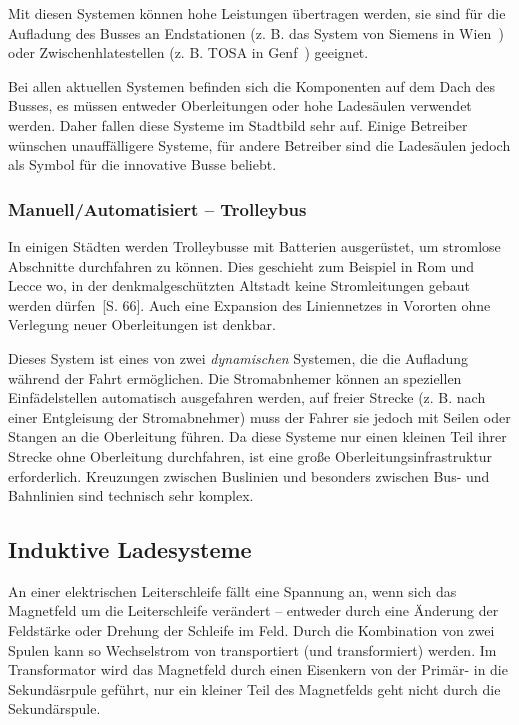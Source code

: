 Mit diesen Systemen können hohe Leistungen übertragen werden, sie sind für die Aufladung des Busses an Endstationen (z. B. das System von Siemens in Wien~\cite{SiemensWien}) oder Zwischenhlatestellen (z. B. TOSA in Genf~\cite{tosa}) geeignet. 

Bei allen aktuellen Systemen befinden sich die Komponenten auf dem Dach des Busses, es müssen entweder Oberleitungen oder hohe Ladesäulen verwendet werden. Daher fallen diese Systeme im Stadtbild sehr auf. Einige Betreiber wünschen unauffälligere Systeme, für andere Betreiber sind die Ladesäulen jedoch als Symbol für die innovative Busse beliebt.

\subsubsection{Manuell/Automatisiert – Trolleybus}
In einigen Städten werden Trolleybusse mit Batterien ausgerüstet, um stromlose Abschnitte durchfahren zu können. Dies geschieht zum Beispiel in Rom und Lecce wo, in der denkmalgeschützten Altstadt keine Stromleitungen gebaut werden dürfen~\cite{tub_aleph001746639}[S. 66]. Auch eine Expansion des Liniennetzes in Vororten ohne Verlegung neuer Oberleitungen ist denkbar.

Dieses System ist eines von zwei \emph{dynamischen} Systemen, die die Aufladung während der Fahrt ermöglichen. Die Stromabnhemer können an speziellen Einfädelstellen automatisch ausgefahren werden, auf freier Strecke (z. B. nach einer Entgleisung der Stromabnehmer) muss der Fahrer sie jedoch mit Seilen oder Stangen an die Oberleitung führen. Da diese Systeme nur einen kleinen Teil ihrer Strecke ohne Oberleitung durchfahren, ist eine große Oberleitungsinfrastruktur erforderlich. Kreuzungen zwischen Buslinien und besonders zwischen Bus- und Bahnlinien sind technisch sehr komplex.
                                 
\subsection{Induktive Ladesysteme}
An einer elektrischen Leiterschleife fällt eine Spannung an, wenn sich das Magnetfeld um die Leiterschleife verändert – entweder durch eine Änderung der Feldstärke oder Drehung der Schleife im Feld. Durch die Kombination von zwei Spulen kann so Wechselstrom von transportiert (und transformiert) werden. Im Transformator wird das Magnetfeld durch einen Eisenkern von der Primär- in die Sekundäsrpule geführt, nur ein kleiner Teil des Magnetfelds geht nicht durch die Sekundärspule.

